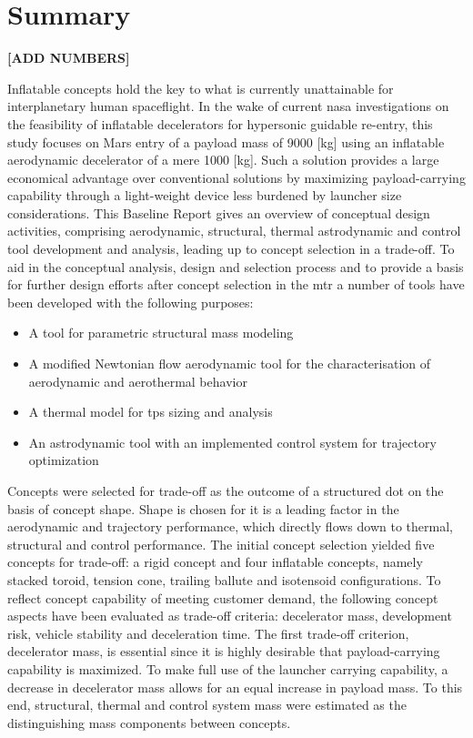 \section*{Summary}\label{cha:summary}

\textbf{[ADD NUMBERS]}

Inflatable concepts hold the key to what is currently unattainable for interplanetary human spaceflight. In the wake of current \acrfull{nasa} investigations on the feasibility of inflatable decelerators for hypersonic guidable re-entry, this study focuses on Mars entry of a payload mass of 9000 [kg] using an inflatable aerodynamic decelerator of a mere 1000 [kg]. Such a solution provides a large economical advantage over conventional solutions by maximizing payload-carrying capability through a light-weight device less burdened by launcher size considerations. This Baseline Report gives an overview of conceptual design activities, comprising aerodynamic, structural, thermal astrodynamic and control tool development and analysis, leading up to concept selection in a trade-off.
\newline
\newline
To aid in the conceptual analysis, design and selection process and to provide a basis for further design efforts after concept selection in the \acrfull{mtr} a number of tools have been developed with the following purposes:
\begin{itemize}
\item A tool for parametric structural mass modeling
\item A modified Newtonian flow aerodynamic tool for the characterisation of aerodynamic and aerothermal behavior
\item A thermal model for \acrfull{tps} sizing and analysis
\item An astrodynamic tool with an implemented control system for trajectory optimization 
\end{itemize}

Concepts were selected for trade-off as the outcome of a structured \acrfull{dot} on the basis of concept shape. Shape is chosen for it is a leading factor in the aerodynamic and trajectory performance, which directly flows down to thermal, structural and control performance. The initial concept selection yielded five concepts for trade-off: a rigid concept and four inflatable concepts, namely stacked toroid, tension cone, trailing ballute and isotensoid configurations. To reflect concept capability of meeting customer demand, the following concept aspects have been evaluated as trade-off criteria: decelerator mass, development risk, vehicle stability and deceleration time.
\newline
\newline
The first trade-off criterion, decelerator mass, is essential since it is highly desirable that payload-carrying capability is maximized. To make full use of the launcher carrying capability, a decrease in decelerator mass allows for an equal increase in payload mass. To this end, structural, thermal and control system mass were estimated as the distinguishing mass components between concepts. 

